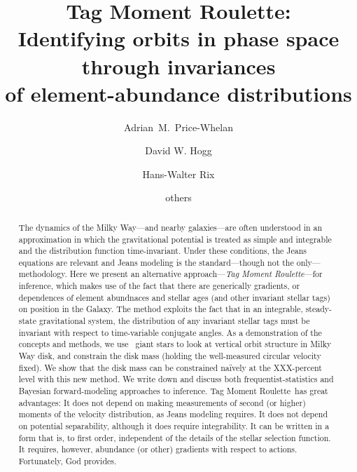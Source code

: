 \documentclass[modern]{aastex63}
\newcommand{\methodname}{Tag Moment Roulette}
\newcommand{\apogee}{\acronym{APOGEE}}
\begin{document}
\sloppy\sloppypar\raggedbottom\frenchspacing %
\graphicspath{ {figures/} }

\title{\textbf{%
\methodname:\\
Identifying orbits in phase space through invariances\\
of element-abundance distributions}}

\author[0000-0003-0872-7098]{Adrian~M.~Price-Whelan}

\author[0000-0003-2866-9403]{David W. Hogg}

\author[0000-0003-4996-9069]{Hans-Walter Rix}

\author{others}

\begin{abstract}\noindent %
  The dynamics of the Milky Way---and nearby galaxies---are often
  understood in an approximation in which the gravitational potential
  is treated as simple and integrable and the distribution function
  time-invariant.
  Under these conditions, the Jeans equations are relevant and Jeans
  modeling is the standard---though not the only---methodology.
  Here we present an alternative approach---\textsl{\methodname}---for
  inference, which makes
  use of the fact that there are generically gradients, or dependences
  of element abundnaces and stellar ages (and other invariant stellar
  tags) on position in the Galaxy.
  The method exploits the fact that in an integrable, steady-state
  gravitational system, the distribution of any invariant stellar tags
  must be invariant with respect to time-variable conjugate angles.
  As a demonstration of the concepts and methods, we use
  \apogee\ giant stars to look at vertical orbit structure in Milky
  Way disk, and constrain the disk mass (holding the well-measured
  circular velocity fixed).
  We show that the disk mass can be constrained na\"ively at the
  XXX-percent level with this new method.
  We write down and discuss both frequentist-statistics and Bayesian
  forward-modeling approaches to inference.
  \methodname\ has great advantages:
  It does not depend on making measurements of second (or higher)
  moments of the velocity distribution, as Jeans modeling
  requires.
  It does not depend on potential separability, although it does require
  integrability.
  It can be written in a form that is, to first order, independent
  of the details of the stellar selection function.
  It requires, however, abundance (or other) gradients with respect to actions.
  Fortunately, God provides.
\end{abstract}
\end{document}
